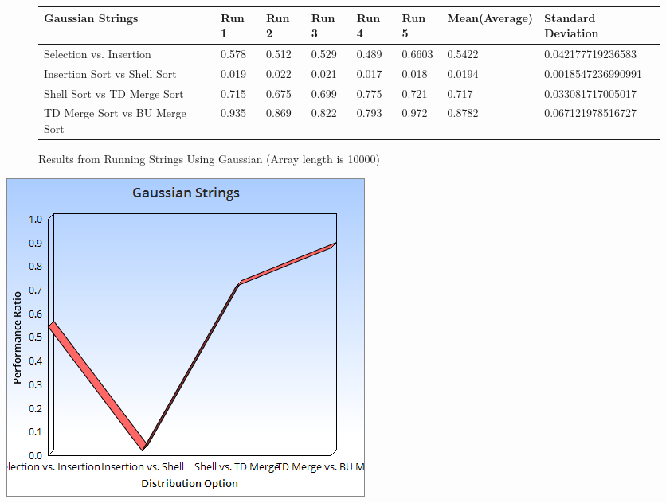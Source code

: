 \documentclass{article}
\begin{document}
\begin{figure}[H]
\centering
\begin{adjustwidth}{-3.4cm}{}
\begin{tabular}{| l | l | l | l | l | l | l | l |}
\hline
Gaussian Strings & Run 1 & Run 2 & Run 3 & Run 4 & Run 5 & Mean(Average) & Standard Deviation\\ \hline
Selection vs. Insertion & 0.578 & 0.512 & 0.529 & 0.489 & 0.6603 & 0.5422 & 0.042177719236583\\ \hline
Insertion Sort vs Shell Sort & 0.019 & 0.022 & 0.021 & 0.017 & 0.018 & 0.0194 & 0.0018547236990991 \\ \hline
Shell Sort vs TD Merge Sort & 0.715 & 0.675 & 0.699 & 0.775 & 0.721 & 0.717 & 0.033081717005017\\ \hline
TD Merge Sort vs BU Merge Sort & 0.935 & 0.869 & 0.822 & 0.793 & 0.972 & 0.8782 & 0.067121978516727\\ \hline
\end{tabular}
\caption{Results from Running Strings Using Gaussian (Array length is 10000)}
\end{adjustwidth}
\end{figure}
\includegraphics[scale=0.5]{GaussianStrings.png}
\end{document}
